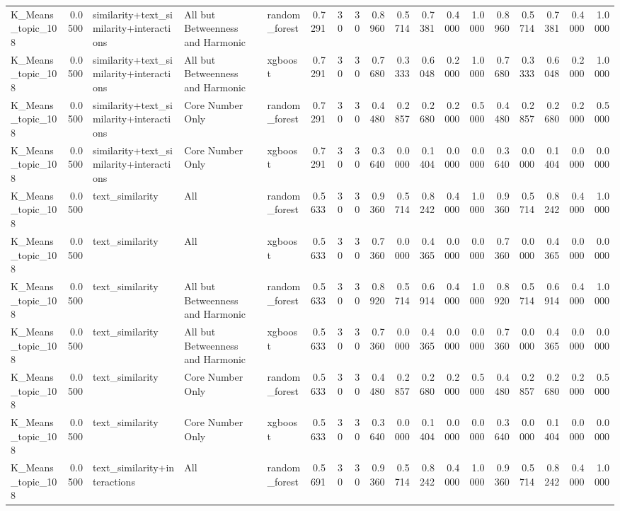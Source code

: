 \begin{tabular}{lrlllrrrrrrrrrrrrr}
K_Means_topic_108 & 0.0500 & similarity+text_similarity+interactions & All but Betweenness and Harmonic & random_forest & 0.7291 & 30 & 30 & 0.8960 & 0.5714 & 0.7381 & 0.4000 & 1.0000 & 0.8960 & 0.5714 & 0.7381 & 0.4000 & 1.0000 \\
K_Means_topic_108 & 0.0500 & similarity+text_similarity+interactions & All but Betweenness and Harmonic & xgboost & 0.7291 & 30 & 30 & 0.7680 & 0.3333 & 0.6048 & 0.2000 & 1.0000 & 0.7680 & 0.3333 & 0.6048 & 0.2000 & 1.0000 \\
K_Means_topic_108 & 0.0500 & similarity+text_similarity+interactions & Core Number Only & random_forest & 0.7291 & 30 & 30 & 0.4480 & 0.2857 & 0.2680 & 0.2000 & 0.5000 & 0.4480 & 0.2857 & 0.2680 & 0.2000 & 0.5000 \\
K_Means_topic_108 & 0.0500 & similarity+text_similarity+interactions & Core Number Only & xgboost & 0.7291 & 30 & 30 & 0.3640 & 0.0000 & 0.1404 & 0.0000 & 0.0000 & 0.3640 & 0.0000 & 0.1404 & 0.0000 & 0.0000 \\
K_Means_topic_108 & 0.0500 & text_similarity & All & random_forest & 0.5633 & 30 & 30 & 0.9360 & 0.5714 & 0.8242 & 0.4000 & 1.0000 & 0.9360 & 0.5714 & 0.8242 & 0.4000 & 1.0000 \\
K_Means_topic_108 & 0.0500 & text_similarity & All & xgboost & 0.5633 & 30 & 30 & 0.7360 & 0.0000 & 0.4365 & 0.0000 & 0.0000 & 0.7360 & 0.0000 & 0.4365 & 0.0000 & 0.0000 \\
K_Means_topic_108 & 0.0500 & text_similarity & All but Betweenness and Harmonic & random_forest & 0.5633 & 30 & 30 & 0.8920 & 0.5714 & 0.6914 & 0.4000 & 1.0000 & 0.8920 & 0.5714 & 0.6914 & 0.4000 & 1.0000 \\
K_Means_topic_108 & 0.0500 & text_similarity & All but Betweenness and Harmonic & xgboost & 0.5633 & 30 & 30 & 0.7360 & 0.0000 & 0.4365 & 0.0000 & 0.0000 & 0.7360 & 0.0000 & 0.4365 & 0.0000 & 0.0000 \\
K_Means_topic_108 & 0.0500 & text_similarity & Core Number Only & random_forest & 0.5633 & 30 & 30 & 0.4480 & 0.2857 & 0.2680 & 0.2000 & 0.5000 & 0.4480 & 0.2857 & 0.2680 & 0.2000 & 0.5000 \\
K_Means_topic_108 & 0.0500 & text_similarity & Core Number Only & xgboost & 0.5633 & 30 & 30 & 0.3640 & 0.0000 & 0.1404 & 0.0000 & 0.0000 & 0.3640 & 0.0000 & 0.1404 & 0.0000 & 0.0000 \\
K_Means_topic_108 & 0.0500 & text_similarity+interactions & All & random_forest & 0.5691 & 30 & 30 & 0.9360 & 0.5714 & 0.8242 & 0.4000 & 1.0000 & 0.9360 & 0.5714 & 0.8242 & 0.4000 & 1.0000 \\

\end{tabular}
